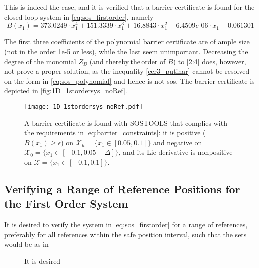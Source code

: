 \vspace{-2mm}
This is indeed the case, and it is verified that a barrier certificate is found for the closed-loop system in \autoref{eq:sos_firstorder}, namely
\vspace{-2mm}
\begin{equation}
B(x_1) = 373.0249\cdot x_1^4 + 151.3339\cdot x_1^3 + 16.8843\cdot x_1^2 - 6.4509e\text{-}06\cdot x_1 - 0.061301
\end{equation}

\vspace{-3mm}
The first three coefficients of the polynomial barrier certificate are of ample size (not in the order 1e-5 or less), while the last seem unimportant. Decreasing the degree of the monomial $Z_B$ (and thereby\,the\,order of $B$) to [2:4] does, however, not prove a proper solution, as the inequality \autoref{cer3_putinar} cannot be resolved on the form in \autoref{eq:sos_polynomial} and hence is not \gls{sos}. The  barrier certificate is depicted in \autoref{fig:1D_1stordersys_noRef}.

\begin{figure}[htbp]
\centering%
\texttt{[image: 1D\_1stordersys\_noRef.pdf]}
	\caption{A barrier certificate is found with SOSTOOLS that complies with the requirements in \autoref{eq:barrier_constraints}: it is positive ($B(x_1)\geq \bar{\epsilon}$) on $\mathcal{X}_u=\{x_1\in [0.05,0.1]\}$ and negative on $\mathcal{X}_0=\{x_1\in [-0.1,0.05-\Delta]\}$, and its Lie derivative is nonpositive on $\mathcal{X}=\{x_1\in [-0.1,0.1]\}$.}
	\label{fig:1D_1stordersys_noRef}
\end{figure}












\subsection{Verifying a Range of Reference Positions for the First Order System}

It is desired to verify the system in \autoref{eq:sos_firstorder} for a range of references, preferably for all references within the safe position interval, such that the sets would be as in 

\begin{figure}[htbp]
\centering
{}%
\hspace{3mm}
%
\hspace{3mm}
%
\caption{It is desired}
\label{fig:sets_reference}
\end{figure}


